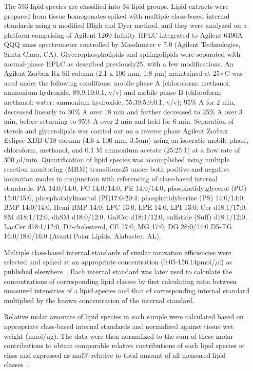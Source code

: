 \documentclass[letterpaper]{article}
\begin{document}
The 593 lipid species are classified into 34 lipid groups. 
Lipid extracts were prepared from tissue homogenates spiked with multiple
class-based internal standards using a modified Bligh and Dyer method, and
they were analyzed on a platform comprising of Agilent 1260 Infinity HPLC
integrated to Agilent 6490A QQQ mass spectrometer controlled by Masshunter v
7.0 (Agilent Technologies, Santa Clara, CA). Glycerophospholipids and
sphingolipids were separated with normal-phase HPLC as described previously25,
with a few modifications. An Agilent Zorbax Rx-Sil column (2.1 x 100 mm, 1.8
$\mu$m) maintained at $25\circ$C was used under the following conditions: mobile phase A
(chloroform: methanol: ammonium hydroxide, 89.9:10:0.1, v/v) and mobile phase
B (chloroform: methanol: water: ammonium hydroxide, 55:39:5.9:0.1, v/v); 95\% A
for 2 min, decreased linearly to 30\% A over 18 min and further decreased to
25\% A over 3 min, before returning to 95\% A over 2 min and held for 6 min.
Separation of sterols and glycerolipids was carried out on a reverse phase
Agilent Zorbax Eclipse XDB-C18 column (4.6 x 100 mm, 3.5um) using an isocratic
mobile phase, chloroform, methanol, and 0.1 M ammonium acetate (25:25:1) at a
flow rate of 300 $\mu$l/min.
Quantification of lipid species was accomplished using multiple reaction
monitoring (MRM) transitions25 under both positive and negative ionization
modes in conjunction with referencing of class-based internal standards: PA
14:0/14:0, PC 14:0/14:0, PE 14:0/14:0, phosphatidylglycerol (PG) 15:0/15:0,
phosphatidylinositol (PI)17:0-20:4; phosphatidylserine (PS) 14:0/14:0, BMP
14:0/14:0, Hemi BMP 14:0; LPC 13:0,  LPE 14:0, LPI 13:0, Cer d18:1/17:0, SM
d18:1/12:0, dhSM d18:0/12:0, GalCer d18:1/12:0, sulfatide (Sulf) d18:1/12:0,
LacCer d18:1/12:0, D7-cholesterol, CE 17:0, MG 17:0, DG 28:0/14:0 D5-TG
16:0/18:0/16:0 (Avanti Polar Lipids, Alabaster, AL). 

Multiple class-based internal standards of similar ionization efficiencies
were selected and spiked at an appropriate concentration
(0.05-156.14pmol/$\mu$l) as published elsewhere~\citep{Chan2017}. Each
internal standard was later used to calculate the concentrations of
corresponding lipid classes by first calculating ratio between measured
intensities of a lipid species and that of corresponding internal standard
multiplied by the known concentration of the internal standard.

Relative molar amounts of lipid species in each sample were calculated based
on appropriate class-based internal standards and normalized against tissue
wet weight (nmol/ug). The data were then normalized to the sum of these molar
contributions to obtain comparable relative contributions of each lipid
species or class and expressed as mol\% relative to total amount of all
measured lipid classes~\citep{Hartler2014,Guan2013}.
\end{document}
